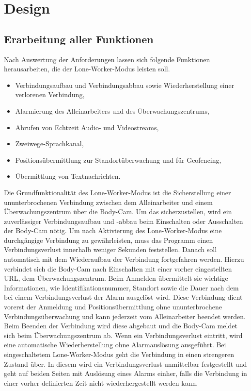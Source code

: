 \documentclass[thesis.tex]{subfiles}
\begin{document}
\chapter{Design}\label{chap:design}

\section{Erarbeitung aller Funktionen}\label{chap:funktionen}
Nach Auswertung der Anforderungen lassen sich folgende Funktionen herausarbeiten, die der Lone-Worker-Modus leisten soll.
\begin{itemize}
    \item Verbindungsaufbau und Verbindungsabbau sowie Wiederherstellung einer verlorenen Verbindung,
    \item Alarmierung des Alleinarbeiters und des Überwachungszentrums,
    \item Abrufen von Echtzeit Audio- und Videostreams,
    \item Zweiwege-Sprachkanal,
    \item Positionsübermittlung zur Standortüberwachung und für Geofencing,
    \item Übermittlung von Textnachrichten.
\end{itemize}

Die Grundfunktionalität des Lone-Worker-Modus ist die Sicherstellung einer ununterbrochenen Verbindung zwischen dem Alleinarbeiter und einem Überwachungszentrum über die Body-Cam.
Um das sicherzustellen, wird ein zuverlässiger Verbindungsaufbau und -abbau beim Einschalten oder Ausschalten der Body-Cam nötig.
Um nach Aktivierung des Lone-Worker-Modus eine durchgängige Verbindung zu gewährleisten, muss das Programm einen Verbindungsverlust innerhalb weniger Sekunden feststellen.
Danach soll automatisch mit dem Wiederaufbau der Verbindung fortgefahren werden.
Hierzu verbindet sich die Body-Cam nach Einschalten mit einer vorher eingestellten URL, dem Überwachungszentrum.
Beim Anmelden übermittelt sie wichtige Informationen, wie Identifikationsnummer, Standort sowie die Dauer nach dem bei einem Verbindungsverlust der Alarm ausgelöst wird.
Diese Verbindung dient vorerst der Anmeldung und Positionsübermittlung ohne ununterbrochene Verbindungsüberwachung und kann jederzeit vom Alleinarbeiter beendet werden.
Beim Beenden der Verbindung wird diese abgebaut und die Body-Cam meldet sich beim Überwachungszentrum ab.
Wenn ein Verbindungsverlust eintritt, wird eine automatische Wiederherstellung ohne Alarmauslösung ausgeführt.
Bei eingeschaltetem Lone-Worker-Modus geht die Verbindung in einen strengeren Zustand über.
In diesem wird ein Verbindungsverlust unmittelbar festgestellt und geht auf beiden Seiten mit Auslösung eines Alarms einher, falls die Verbindung in einer vorher definierten Zeit nicht wiederhergestellt werden kann.
\end{document}

